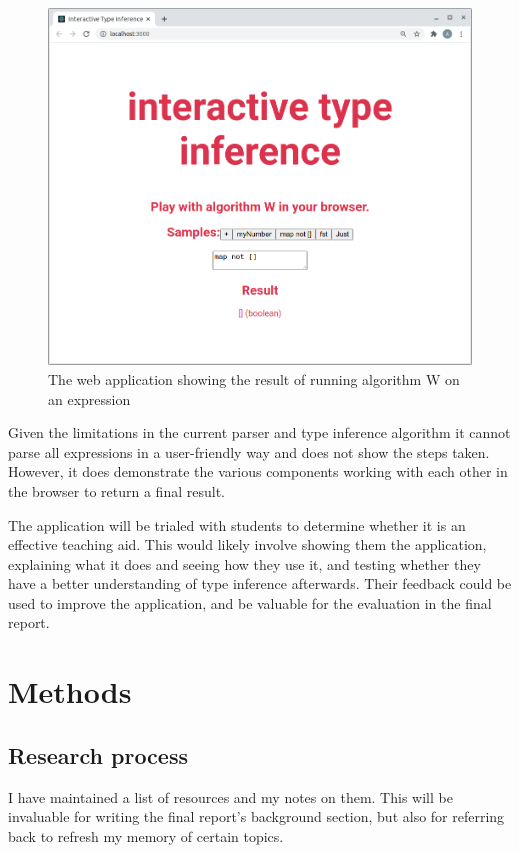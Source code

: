 \documentclass[a4paper,fleqn,12pt]{article}
\begin{document}
{\centering \begin{figure}[h!]
  \centering
  \includegraphics[width=0.818\linewidth]{images/image1.png}
  \caption{The web application showing the result of running algorithm W on an expression}
\end{figure} \par}

Given the limitations in the current parser and type inference algorithm it cannot parse all expressions in a user-friendly way and does not show the steps taken. However, it does demonstrate the various components working with each other in the browser to return a final result.

The application will be trialed with students to determine whether it is an effective teaching aid. This would likely involve showing them the application, explaining what it does and seeing how they use it, and testing whether they have a better understanding of type inference afterwards. Their feedback could be used to improve the application, and be valuable for the evaluation in the final report.

\section{Methods}\label{id:h.em0ria5zbf4p}

\subsection{Research process}\label{id:h.ew85fk610kqt}

I have maintained a list of resources and my notes on them. This will be invaluable for writing the final report’s background section, but also for referring back to refresh my memory of certain topics.
\end{document}
